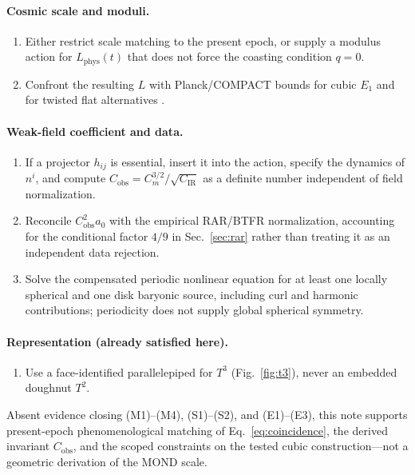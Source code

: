 \documentclass[aps,prd,reprint,superscriptaddress,nofootinbib,floatfix,showkeys]{revtex4-2}
\newcommand{\Tthree}{T^{3}}
\newcommand{\Ttwo}{T^{2}}
\newcommand{\Cobs}{C_{\mathrm{obs}}}
\newcommand{\Cm}{C_{m}}
\newcommand{\CIR}{C_{\mathrm{IR}}}
\newcommand{\azero}{a_{0}}
\begin{document}
\paragraph{Cosmic scale and moduli.}
\begin{enumerate}
\item[(S1)] Either restrict scale matching to the present epoch, or supply a
  modulus action for \(L_{\mathrm{phys}}(t)\) that does not force the
  coasting condition \(q=0\).
\item[(S2)] Confront the resulting \(L\) with Planck/COMPACT bounds for cubic
  \(E_1\) and for twisted flat alternatives \cite{planck_topology,compact_promise}.
\end{enumerate}

\paragraph{Weak-field coefficient and data.}
\begin{enumerate}
\item[(E1)] If a projector \(h_{ij}\) is essential, insert it into the action,
  specify the dynamics of \(n^{i}\), and compute
  \(\Cobs=\Cm^{3/2}/\sqrt{\CIR}\)
  as a definite number independent of field normalization.
\item[(E2)] Reconcile \(\Cobs^{2}\azero\) with the empirical RAR/BTFR
  normalization, accounting for the conditional factor \(4/9\) in
  Sec.~\ref{sec:rar} rather than treating it as an independent data rejection.
\item[(E3)] Solve the compensated periodic nonlinear equation for at least one
  locally spherical and one disk baryonic source, including curl and harmonic
  contributions; periodicity does not supply global spherical symmetry.
\end{enumerate}

\paragraph{Representation (already satisfied here).}
\begin{enumerate}
\item[(R1)] Use a face-identified parallelepiped for \(\Tthree\)
  (Fig.~\ref{fig:t3}), never an embedded doughnut \(\Ttwo\).
\end{enumerate}

Absent evidence closing (M1)--(M4), (S1)--(S2), and (E1)--(E3), this note
supports present-epoch phenomenological matching of
Eq.~\eqref{eq:coincidence}, the derived invariant \(\Cobs\), and the scoped
constraints on the tested cubic construction---not a geometric derivation of
the MOND scale.
\end{document}
